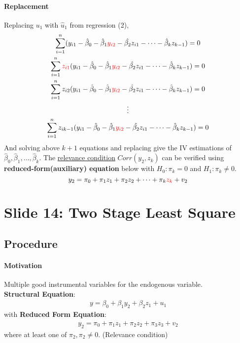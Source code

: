 \documentclass[]{article}
\begin{document}
			\paragraph{Replacement} Replacing $u_1$ with $\hat{u}_1$ from regression (2),
			\begin{gather*}
				\sum_{i=1}^n(y_{i1} - \hat{\beta}_0 - \hat{\beta}_1 \textcolor{red}{y_{i2}} - \hat{\beta_2}z_{i1} - \cdots - \hat{\beta}_k z_{k-1}) = 0 \\
				\sum_{i=1}^n \textcolor{red}{z_{i1}} (y_{i1} - \hat{\beta}_0 - \hat{\beta}_1 \textcolor{red}{y_{i2}} - \hat{\beta_2}z_{i1} - \cdots - \hat{\beta}_k z_{k-1}) = 0 \\
				\sum_{i=1}^n z_{i2} (y_{i1} - \hat{\beta}_0 - \hat{\beta}_1 \textcolor{red}{y_{i2}} - \hat{\beta_2}z_{i1} - \cdots - \hat{\beta}_k z_{k-1}) = 0 \\
				\vdots \\
				\sum_{i=1}^n z_{ik-1}(y_{i1} - \hat{\beta}_0 - \hat{\beta}_1 \textcolor{red}{y_{i2}} - \hat{\beta_2}z_{i1} - \cdots - \hat{\beta}_k z_{k-1}) = 0
			\end{gather*}
			And solving above $k+1$ equations and replacing  give the IV estimations of $\hat{\beta}_0, \hat{\beta}_1, \dots, \hat{\beta}_{k}$.
			\newline
			The \ul{relevance condition} $Corr(y_2, z_k)$ can be verified using \textbf{reduced-form(auxiliary) equation} below with $H_0: \pi_k = 0$ and $H_1: \pi_k \neq 0$.
			\[
				y_2 = \pi_0 + \pi_1 z_1 + \pi_2 z_2 + \cdots + \pi_k \textcolor{red}{z_k} + v_2
			\]
	
	\section{Slide 14: Two Stage Least Square}
	\subsection{Procedure}
		\paragraph{Motivation} Multiple good instrumental variables for the endogenous variable. \\
		\textbf{Structural Equation}: 
		\begin{gather}
			y = \beta_0 + \beta_1 y_2 + \beta_2 z_1 + u_1
		\end{gather}
		with \textbf{Reduced Form Equation}:
		\begin{gather}
			y_2 = \pi_0 + \pi_1 z_1 + \pi_2 z_2 + \pi_3 z_3 + v_2
		\end{gather}
		where at least one of $\pi_2, \pi_2 \neq 0$. (Relevance condition) \\
\end{document}
